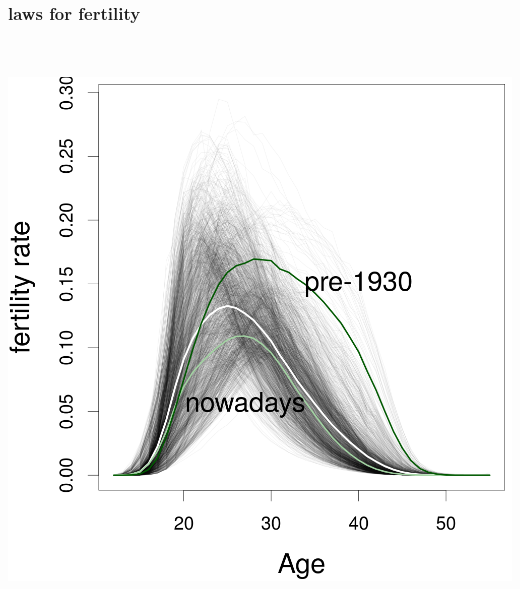 \documentclass[20pt]{beamer}
\begin{document}
\begin{frame}
\frametitle{laws for fertility}
\vspace{-1em}
\begin{center}
\includegraphics[height=6in]{Figures/Fertility3.png}
\end{center}
\end{frame}
\end{document}
